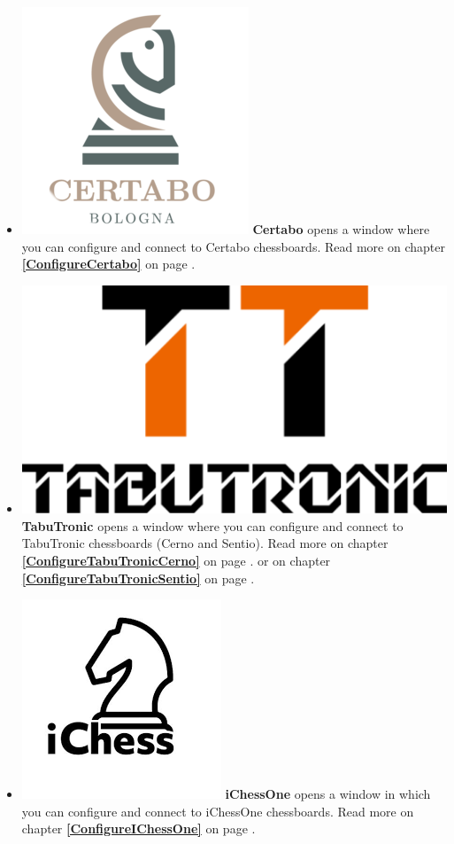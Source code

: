 \documentclass[11pt,a4paper]{article}
\begin{document}
\begin{itemize}
	\item  \includegraphics[scale=0.1]{Certabo_icon.png} \textbf{Certabo} opens a window where you can configure and connect to Certabo chessboards.  Read more on chapter \textbf{\ref{ConfigureCertabo}  } on page \pageref{ConfigureCertabo}.
    \item  \includegraphics[scale=0.05]{tabutronic_logo_def.png} \textbf{TabuTronic} opens a window where you can configure and connect to TabuTronic chessboards (Cerno and Sentio). Read more on chapter \textbf{\ref{ConfigureTabuTronicCerno}  } on page \pageref{ConfigureTabuTronicCerno}.	or on chapter \textbf{\ref{ConfigureTabuTronicSentio}  } on page \pageref{ConfigureTabuTronicSentio}.	
    \item  \includegraphics[scale=0.1]{iChessOneIcon.png} \textbf{iChessOne} opens a window in which you can configure and connect to iChessOne chessboards.  Read more on chapter \textbf{\ref{ConfigureIChessOne}  } on page \pageref{ConfigureIChessOne}.    

\end{itemize}
\end{document}
